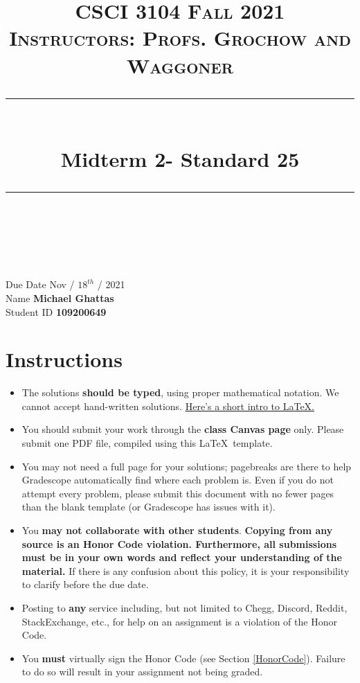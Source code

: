\documentclass[11pt]{article}
\title{
\normalfont \normalsize 
\textsc{CSCI 3104 Fall 2021 \\ 
Instructors: Profs. Grochow and Waggoner} \\
[10pt] 
\rule{\linewidth}{0.5pt} \\[6pt] 
\huge Midterm 2- Standard 25 \\
\rule{\linewidth}{2pt}  \\[10pt]
}
\date{}
\theoremstyle{definition}
\theoremstyle{definition}
\theoremstyle{definition}
\begin{document}

\maketitle


\noindent
Due Date \dotfill Nov / $18^{th}$ / 2021 \\
Name \dotfill \textbf{Michael Ghattas} \\
Student ID \dotfill \textbf{109200649} \\


\tableofcontents

\section{Instructions}
 \begin{itemize}
	\item The solutions \textbf{should be typed}, using proper mathematical notation. We cannot accept hand-written solutions. \href{http://ece.uprm.edu/~caceros/latex/introduction.pdf}{Here's a short intro to \LaTeX.}
	\item You should submit your work through the \textbf{class Canvas page} only. Please submit one PDF file, compiled using this \LaTeX \ template.
	\item You may not need a full page for your solutions; pagebreaks are there to help Gradescope automatically find where each problem is. Even if you do not attempt every problem, please submit this document with no fewer pages than the blank template (or Gradescope has issues with it).

	\item You \textbf{may not collaborate with other students}. \textbf{Copying from any source is an Honor Code violation. Furthermore, all submissions must be in your own words and reflect your understanding of the material.} If there is any confusion about this policy, it is your responsibility to clarify before the due date. 

	\item Posting to \textbf{any} service including, but not limited to Chegg, Discord, Reddit, StackExchange, etc., for help on an assignment is a violation of the Honor Code.

	\item You \textbf{must} virtually sign the Honor Code (see Section \ref{HonorCode}). Failure to do so will result in your assignment not being graded.
\end{itemize}
\end{document}
